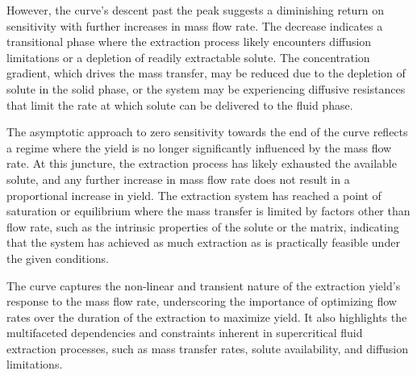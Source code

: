 \documentclass[../Article_Sensitivity_Analsysis.tex]{subfiles}
\begin{document}
	However, the curve’s descent past the peak suggests a diminishing return on sensitivity with further increases in mass flow rate. The decrease indicates a transitional phase where the extraction process likely encounters diffusion limitations or a depletion of readily extractable solute. The concentration gradient, which drives the mass transfer, may be reduced due to the depletion of solute in the solid phase, or the system may be experiencing diffusive resistances that limit the rate at which solute can be delivered to the fluid phase.
	
	The asymptotic approach to zero sensitivity towards the end of the curve reflects a regime where the yield is no longer significantly influenced by the mass flow rate. At this juncture, the extraction process has likely exhausted the available solute, and any further increase in mass flow rate does not result in a proportional increase in yield. The extraction system has reached a point of saturation or equilibrium where the mass transfer is limited by factors other than flow rate, such as the intrinsic properties of the solute or the matrix, indicating that the system has achieved as much extraction as is practically feasible under the given conditions.
	
	The curve captures the non-linear and transient nature of the extraction yield's response to the mass flow rate, underscoring the importance of optimizing flow rates over the duration of the extraction to maximize yield. It also highlights the multifaceted dependencies and constraints inherent in supercritical fluid extraction processes, such as mass transfer rates, solute availability, and diffusion limitations.
	
	
\end{document}
